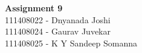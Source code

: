 \documentclass[main.tex]{subfiles}
\begin{document}
\begin{titlepage}

\begin{center}
  \LARGE{\bf{Assignment 9\\}}
  \horrule{0.4pt}
  111408022 - Dnyanada Joshi \\
  111408024 - Gaurav Juvekar \\
  111408025 - K Y Sandeep Somanna \\
\end{center}
\horrule{0.4pt}
\end{titlepage}
\end{document}
